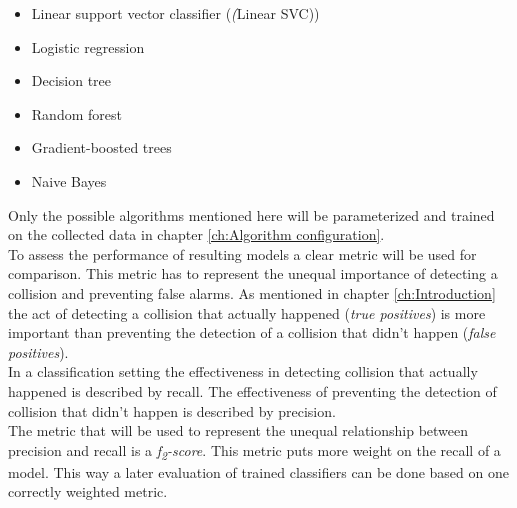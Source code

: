 \begin{itemize}
\item Linear support vector classifier (\emph(Linear SVC))
\item Logistic regression
\item Decision tree
\item Random forest
\item Gradient-boosted trees
\item Naive Bayes
\end{itemize}

Only the possible algorithms mentioned here will be parameterized and trained on the  collected data in chapter \ref{ch:Algorithm configuration}.   \\

To assess the performance of resulting models a clear metric will be used for comparison. This metric has to represent the unequal importance of detecting a collision and preventing false alarms. As mentioned in chapter \ref{ch:Introduction} the act of detecting a collision that actually happened (\emph{true positives}) is more important than preventing the detection of a collision that didn't happen (\emph{false positives}).
\\
In a classification setting the effectiveness in detecting collision that actually happened is described by recall. The effectiveness of preventing the detection of collision that didn't happen is described by precision. 
\\
The metric that will be used to represent the unequal relationship between precision and recall is a\emph{ f\textsubscript{2}-score}. This metric puts more weight on the recall of a model. This way a later evaluation of trained classifiers can be done based on one correctly weighted metric.